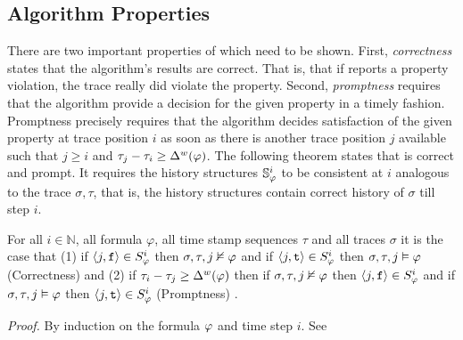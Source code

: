 \subsection{Algorithm Properties}
There are two important properties of \monitor which need to be shown. First, \emph{correctness} states that the algorithm's results are correct.
That is, that if \monitor reports a property violation, the trace really did violate the property.
Second, \emph{promptness} requires that the algorithm provide a decision for the given property in a timely fashion.
Promptness precisely requires that the algorithm decides satisfaction of the
given property at trace position $i$ as soon as there is another trace position
$j$ available such that $j\geq i$ and $\tau_j-\tau_i \geq \Delta^w(\varphi)$.
%
%
The following theorem states that \monitor is correct and prompt. It requires  the history structures $\mathbb{S}^{i}_{\varphi}$
to be consistent at $i$ analogous to the trace $\sigma,\tau$, that is,
the history structures contain correct history of $\sigma$ till step $i$. %

\begin{theorem}
For all $i \in \mathbb{N}$, all formula $\varphi$, all time stamp sequences $\tau$ and all traces $\sigma$ it is the case that (1) if $\langle j, \mathrm{\texttt{f}} \rangle \in {S}^{i}_{\varphi}$ then $\sigma, \tau, j \nvDash \varphi$ and if $\langle j, \mathrm{\texttt{t}} \rangle \in {S}^{i}_{\varphi}$ then $\sigma, \tau, j \vDash \varphi$ (Correctness) and (2) if $\tau_i - \tau_j \geq \Delta^w(\varphi)$ then if $\sigma, \tau, j \nvDash \varphi$ then $\langle j, \mathrm{\texttt{f}} \rangle \in {S}^{i}_{\varphi}$ and if $\sigma, \tau, j \vDash \varphi$ then $\langle j, \mathrm{\texttt{t}} \rangle \in {S}^{i}_{\varphi}$ (Promptness)
.
\end{theorem}
\textit{Proof.} By  induction on the  formula $\varphi$ and time step $i$. See \cite{Kane2015} \\

